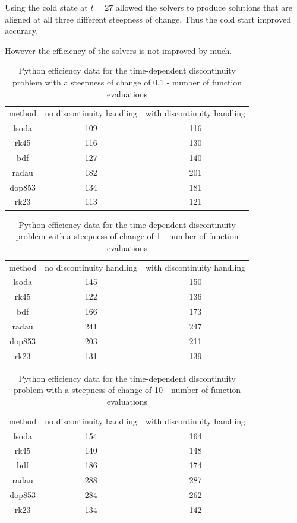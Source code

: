 Using the cold state at $t=27$ allowed the solvers to produce solutions that are aligned at all three different steepness of change. Thus the cold start improved accuracy.

However the efficiency of the solvers is not improved by much.

\begin{table}[H]
\caption {Python efficiency data for the time-dependent discontinuity problem with a steepness of change of 0.1 - number of function evaluations} 
\label{tab:exp_time_0_1} 
\begin{center}
\begin{tabular}{ c c c }
method & no discontinuity handling & with discontinuity handling \\ 
lsoda & 109 & 116 \\
rk45 & 116 & 130 \\
bdf & 127 & 140 \\
radau & 182 & 201 \\
dop853 & 134 & 181 \\
rk23 & 113 & 121 \\
\end{tabular}
\end{center}
\end{table}

\begin{table}[H]
\caption {Python efficiency data for the time-dependent discontinuity problem with a steepness of change of 1 - number of function evaluations} 
\label{tab:exp_time_1} 
\begin{center}
\begin{tabular}{ c c c }
method & no discontinuity handling & with discontinuity handling \\ 
lsoda & 145 & 150 \\
rk45 & 122 & 136 \\
bdf & 166 & 173 \\
radau & 241 & 247 \\
dop853 & 203 & 211 \\
rk23 & 131 & 139 \\
\end{tabular}
\end{center}
\end{table}

\begin{table}[H]
\caption {Python efficiency data for the time-dependent discontinuity problem with a steepness of change of 10 - number of function evaluations} 
\label{tab:exp_time_10} 
\begin{center}
\begin{tabular}{ c c c }
method & no discontinuity handling & with discontinuity handling \\ 
lsoda & 154 & 164 \\
rk45 & 140 & 148 \\
bdf & 186 & 174 \\
radau & 288 & 287 \\
dop853 & 284 & 262 \\
rk23 & 134 & 142 \\
\end{tabular}
\end{center}
\end{table}

